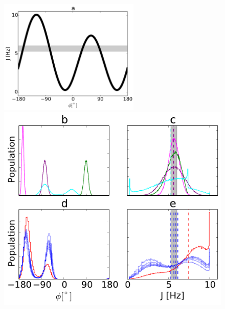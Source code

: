 \documentclass[12pt]{article}
\begin{document}
\begin{figure}

\begin{center}

\includegraphics[height=5.5cm]{../figures/karplus_top_panel_karplus.pdf}

\includegraphics[height=10.0cm]{../figures/karplus_2x2.pdf}

\end{center}

\label{figure:Ambiguity}
\end{figure}
\end{document}

